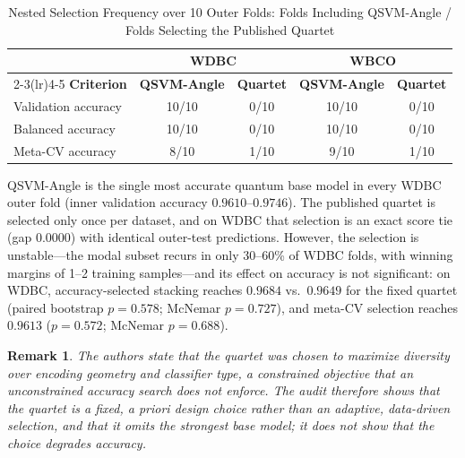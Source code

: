 \documentclass[journal,twocolumn]{IEEEtran}
\newtheorem{remark}{Remark}
\begin{document}
\begin{table}[!t]
\caption{Nested Selection Frequency over 10 Outer Folds: Folds Including QSVM-Angle / Folds Selecting the Published Quartet}
\label{tab:selection}
\centering
\scriptsize
\setlength{\tabcolsep}{4pt}
\renewcommand{\arraystretch}{1.15}
\begin{tabular}{lcccc}
\toprule
& \multicolumn{2}{c}{\textbf{WDBC}} & \multicolumn{2}{c}{\textbf{WBCO}} \\
\cmidrule(lr){2-3}\cmidrule(lr){4-5}
\textbf{Criterion} & \textbf{QSVM-Angle} & \textbf{Quartet} & \textbf{QSVM-Angle} & \textbf{Quartet} \\
\midrule
Validation accuracy & 10/10 & 0/10 & 10/10 & 0/10 \\
Balanced accuracy   & 10/10 & 0/10 & 10/10 & 0/10 \\
Meta-CV accuracy    & 8/10  & 1/10 & 9/10  & 1/10 \\
\bottomrule
\end{tabular}
\end{table}

QSVM-Angle is the single most accurate quantum base model in every WDBC outer fold (inner validation accuracy $0.9610$--$0.9746$). The published quartet is selected only once per dataset, and on WDBC that selection is an exact score tie (gap $0.0000$) with identical outer-test predictions. However, the selection is unstable---the modal subset recurs in only 30--60\% of WDBC folds, with winning margins of 1--2 training samples---and its effect on accuracy is not significant: on WDBC, accuracy-selected stacking reaches $0.9684$ vs.\ $0.9649$ for the fixed quartet (paired bootstrap $p=0.578$; McNemar $p=0.727$), and meta-CV selection reaches $0.9613$ ($p=0.572$; McNemar $p=0.688$).

\begin{remark}
The authors state that the quartet was chosen to maximize diversity over encoding geometry and classifier type, a constrained objective that an unconstrained accuracy search does not enforce. The audit therefore shows that the quartet is a fixed, a priori design choice rather than an adaptive, data-driven selection, and that it omits the strongest base model; it does not show that the choice degrades accuracy.
\end{remark}
\end{document}
